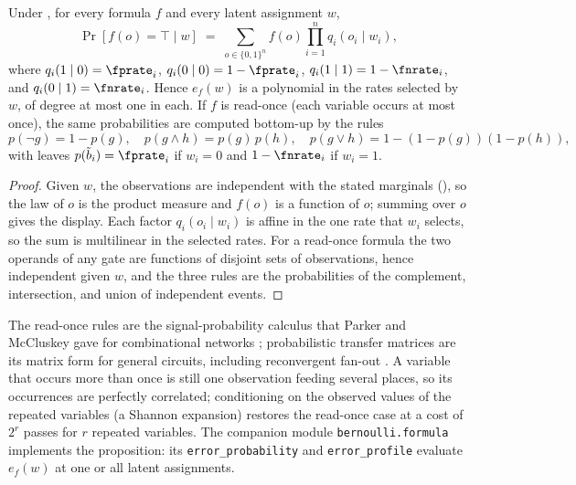 \begin{proposition}
\label{prop:latent-propagation}
Under , for every formula $f$ and every latent
assignment $w$,
\[
  \Pr[f(o) = \top \mid w]
  \;=\; \sum_{o \in \{0,1\}^n} f(o) \prod_{i=1}^{n} q_i(o_i \mid w_i),
\]
where $q_i(1 \mid 0) = \fprate_i$, $q_i(0 \mid 0) = 1 - \fprate_i$,
$q_i(1 \mid 1) = 1 - \fnrate_i$, and $q_i(0 \mid 1) = \fnrate_i$. Hence
$e_f(w)$ is a polynomial in the rates selected by $w$, of degree at most one in
each. If $f$ is read-once (each variable occurs at most once), the same
probabilities are computed bottom-up by the rules
\[
  p(\neg g) = 1 - p(g),
  \quad
  p(g \wedge h) = p(g)\,p(h),
  \quad
  p(g \vee h) = 1 - (1 - p(g))(1 - p(h)),
\]
with leaves $p(\tilde{b}_i) = \fprate_i$ if $w_i = 0$ and $1 - \fnrate_i$ if
$w_i = 1$.
\end{proposition}

\begin{proof}
Given $w$, the observations are independent with the stated marginals
(), so the law of $o$ is the product measure and
$f(o)$ is a function of $o$; summing over $o$ gives the display. Each factor
$q_i(o_i \mid w_i)$ is affine in the one rate that $w_i$ selects, so the sum is
multilinear in the selected rates. For a read-once formula the two operands of
any gate are functions of disjoint sets of observations, hence independent given
$w$, and the three rules are the probabilities of the complement, intersection,
and union of independent events.
\end{proof}

The read-once rules are the signal-probability calculus that Parker and
McCluskey gave for combinational networks
\parencite{parker-mccluskey-1975}; probabilistic transfer matrices are its
matrix form for general circuits, including reconvergent fan-out
\parencite{krishnaswamy-et-al-2008}. A
variable that occurs more than once is still one observation feeding several
places, so its occurrences are perfectly correlated; conditioning on the
observed values of the repeated variables (a Shannon expansion) restores the
read-once case at a cost of $2^r$ passes for $r$ repeated variables. The
companion module \texttt{bernoulli.formula} implements the proposition: its
\texttt{error\_probability} and \texttt{error\_profile} evaluate $e_f(w)$ at one
or all latent assignments.

